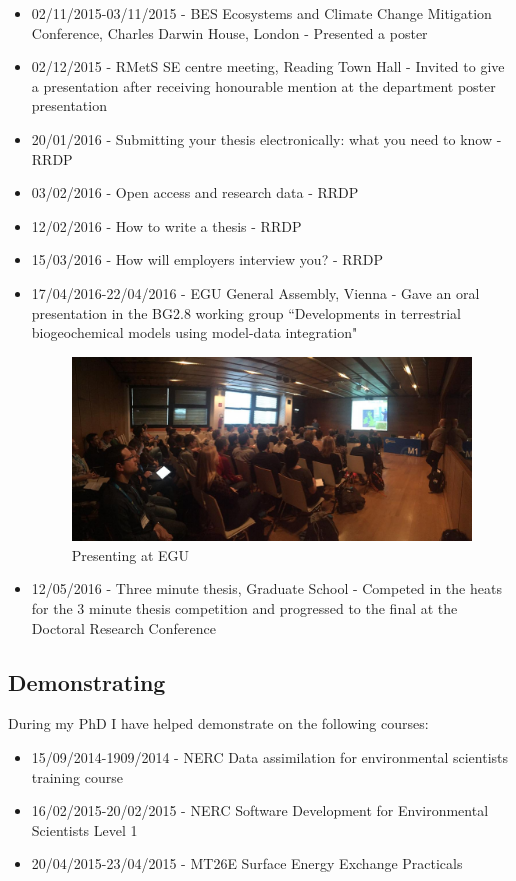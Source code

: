 \documentclass[11pt]{article}
\begin{document}
\begin{itemize}
\item 02/11/2015-03/11/2015 - BES Ecosystems and Climate Change Mitigation Conference, Charles Darwin House, London - Presented a poster

\item 02/12/2015 - RMetS SE centre meeting, Reading Town Hall - Invited to give a presentation after receiving honourable mention at the department poster presentation

\item 20/01/2016 - Submitting your thesis electronically: what you need to know - RRDP

\item 03/02/2016 - Open access and research data - RRDP

\item 12/02/2016 - How to write a thesis - RRDP

\item 15/03/2016 - How will employers interview you? - RRDP

\item 17/04/2016-22/04/2016 - EGU General Assembly, Vienna - Gave an oral presentation in the BG2.8 working group ``Developments in terrestrial biogeochemical models using model-data integration"

\begin{figure}[!ht]
    \centering
    \includegraphics[width=.4\textwidth]{egu2.jpg}
    \caption{Presenting at EGU}
    \label{fig:egu}
\end{figure}

\item 12/05/2016 - Three minute thesis, Graduate School - Competed in the heats for the 3 minute thesis competition and progressed to the final at the Doctoral Research Conference
\end{itemize}

\subsection{Demonstrating}
During my PhD I have helped demonstrate on the following courses:
\begin{itemize}
\item 15/09/2014-1909/2014 - NERC Data assimilation for environmental scientists training course

\item 16/02/2015-20/02/2015 - NERC Software Development for Environmental Scientists Level 1

\item 20/04/2015-23/04/2015 - MT26E Surface Energy Exchange Practicals
\end{itemize}


{}
%
\end{document}
